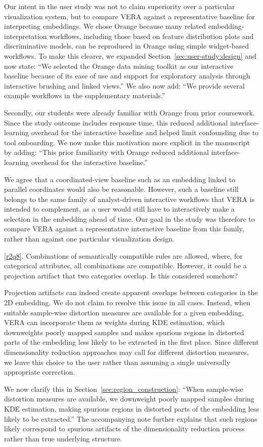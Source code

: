 \documentclass[11pt]{article}
\newcounter{rtaskno}
\newcommand{\rtask}[1]{\refstepcounter{rtaskno}\label{#1}}
\newcommand{\reviewc}[2]{\begin{leftbar}\noindent\rtask{#1}\ref{#1}. #2\end{leftbar}\vspace*{-4mm}}
\newcommand{\answer}[1]{\noindent #1\par\vspace{2mm}}
\newlength{\leftbarwidth}
\newlength{\leftbarsep}
\renewenvironment{leftbar}{%
    \def\FrameCommand{{\color{black}{\vrule width \leftbarwidth\relax\hspace {\leftbarsep}}}}%
    \MakeFramed {\advance \hsize -\width \FrameRestore }%
}{\endMakeFramed}
\begin{document}
\answer{%
Our intent in the user study was not to claim superiority over a particular visualization system, but to compare VERA against a representative baseline for interpreting embeddings.
We chose Orange because many related embedding-interpretation workflows, including those based on feature distribution plots and discriminative models, can be reproduced in Orange using simple widget-based workflows. To make this clearer, we expanded Section~\ref{sec:user-study:design} and now state: ``We selected the Orange data mining toolkit as our interactive baseline because of its ease of use and support for exploratory analysis through interactive brushing and linked views.'' We also now add: ``We provide several example workflows in the supplementary materials.''

Secondly, our students were already familiar with Orange from prior coursework.
Since the study outcome includes response time, this reduced additional interface-learning overhead for the interactive baseline and helped limit confounding due to tool onboarding.
We now make this motivation more explicit in the manuscript by adding: ``This prior familiarity with Orange reduced additional interface-learning overhead for the interactive baseline.''

We agree that a coordinated-view baseline such as an embedding linked to parallel coordinates would also be reasonable. However, such a baseline still belongs to the same family of analyst-driven interactive workflows that VERA is intended to complement, as a user would still have to interactively make a selection in the embedding ahead of time. Our goal in the study was therefore to compare VERA against a representative interactive baseline from this family, rather than against one particular visualization design.
}


\reviewc{r2q8}{Combinations of semantically compatible rules are allowed, where, for categorical attributes, all combinations are compatible. However, it could be a projection artifact that two categories overlap. Is this considered somehow?}

\answer{%
Projection artifacts can indeed create apparent overlaps between categories in the 2D embedding. We do not claim to resolve this issue in all cases. Instead, when suitable sample-wise distortion measures are available for a given embedding, VERA can incorporate them as weights during KDE estimation, which downweights poorly mapped samples and makes spurious regions in distorted parts of the embedding less likely to be extracted in the first place. Since different dimensionality reduction approaches may call for different distortion measures, we leave this choice to the user rather than assuming a single universally appropriate correction.

We now clarify this in Section~\ref{sec:region_construction}: ``When sample-wise distortion measures are available, we downweight poorly mapped samples during KDE estimation, making spurious regions in distorted parts of the embedding less likely to be extracted.'' The accompanying note further explains that such regions likely correspond to spurious artifacts of the dimensionality reduction process rather than true underlying structure.
}
\end{document}
